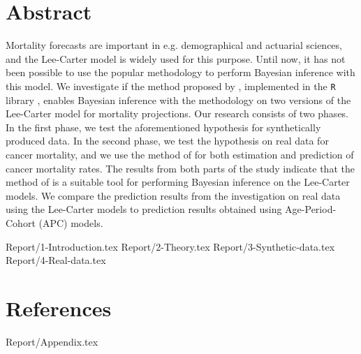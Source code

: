 \documentclass[11pt,a4paper,twoside]{article}
\numberwithin{equation}{section}
\numberwithin{figure}{section}
\begin{document}
\maketitle\thispagestyle{empty}
\clearpage{}

\section*{Abstract}
Mortality forecasts are important in e.g. demographical and actuarial sciences, and the Lee-Carter model \parencite{LeeCarter1992} is widely used for this purpose. Until now, it has not been possible to use the popular \inla methodology to perform Bayesian inference with this model. We investigate if the method proposed by \textcite{BachlLindgren2019}, implemented in the \texttt{R} library \inlabru, enables Bayesian inference with the \inla methodology on two versions of the Lee-Carter model for mortality projections.
Our research consists of two phases. In the first phase, we test the aforementioned hypothesis for synthetically produced data. In the second phase, we test the hypothesis on real data for cancer mortality, and we use the method of \textcite{BachlLindgren2019} for both estimation and prediction of cancer mortality rates. The results from both parts of the study indicate that the method of \textcite{BachlLindgren2019} is a suitable tool for performing Bayesian inference on the Lee-Carter models. We compare the prediction results from the investigation on real data using the Lee-Carter models to prediction results obtained using Age-Period-Cohort (APC) models. 

\clearpage\tableofcontents
\newpage
\printacronyms

\clearpage{}
{Report/1-Introduction.tex}
{Report/2-Theory.tex}
{Report/3-Synthetic-data.tex}
{Report/4-Real-data.tex}


\clearpage
\section*{References}
\printbibliography[heading=none]
%
%
%

\begin{appendices}
\clearpage
{Report/Appendix.tex}
\end{appendices}
\end{document}

